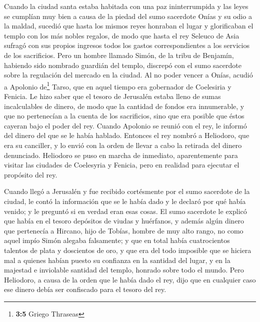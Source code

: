  Cuando la ciudad santa estaba habitada con una paz
ininterrumpida y las leyes se cumplían muy bien a causa de la piedad del
sumo sacerdote Onías y su odio a la maldad,  sucedió que
hasta los mismos reyes honraban el lugar y glorificaban el templo con
los más nobles regalos,  de modo que hasta el rey Seleuco
de Asia sufragó con sus propios ingresos todos los gastos
correspondientes a los servicios de los sacrificios.  Pero
un hombre llamado Simón, de la tribu de Benjamín, habiendo sido nombrado
guardián del templo, discrepó con el sumo sacerdote sobre la regulación
del mercado en la ciudad.  Al no poder vencer a Onías,
acudió a Apolonio de\footnote{\textbf{3:5} Griego Thraseas} Tarso, que
en aquel tiempo era gobernador de Coelesiria y Fenicia. 
Le hizo saber que el tesoro de Jerusalén estaba lleno de sumas
incalculables de dinero, de modo que la cantidad de fondos era
innumerable, y que no pertenecían a la cuenta de los sacrificios, sino
que era posible que éstos cayeran bajo el poder del rey. 
Cuando Apolonio se reunió con el rey, le informó del dinero del que se
le había hablado. Entonces el rey nombró a Heliodoro, que era su
canciller, y lo envió con la orden de llevar a cabo la retirada del
dinero denunciado.  Heliodoro se puso en marcha de
inmediato, aparentemente para visitar las ciudades de Coelesyria y
Fenicia, pero en realidad para ejecutar el propósito del rey.

 Cuando llegó a Jerusalén y fue recibido cortésmente por
el sumo sacerdote de la ciudad, le contó la información que se le había
dado y le declaró por qué había venido; y le preguntó si en verdad eran
esas cosas.  El sumo sacerdote le explicó que había en el
tesoro depósitos de viudas y huérfanos,  y además algún
dinero que pertenecía a Hircano, hijo de Tobías, hombre de muy alto
rango, no como aquel impío Simón alegaba falsamente; y que en total
había cuatrocientos talentos de plata y doscientos de oro,
 y que era del todo imposible que se hiciera mal a
quienes habían puesto su confianza en la santidad del lugar, y en la
majestad e inviolable santidad del templo, honrado sobre todo el mundo.
 Pero Heliodoro, a causa de la orden que le había dado el
rey, dijo que en cualquier caso ese dinero debía ser confiscado para el
tesoro del rey.

